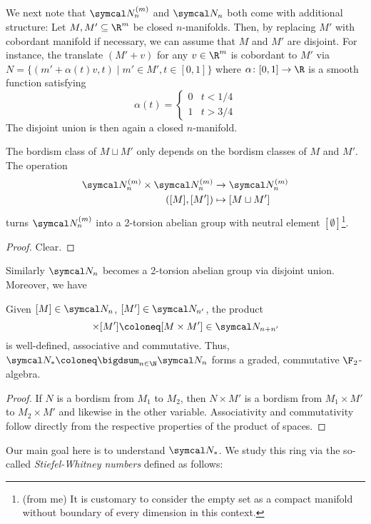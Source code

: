 We next note that $\Bord_n^{(m)}$ and $\Bord_n$ both come with additional structure:
Let $M, M' \subseteq \R^m$ be closed $n$-manifolds.
Then, by replacing $M'$ with cobordant manifold if necessary, we can assume that $M$ and $M'$ are disjoint. For instance, the translate $(M' + v)$ for any $v \in \R^m$ is cobordant to $M'$ via $N = \{(m' + \alpha(t)v, t) \mid m' \in M', t \in [0, 1]\}$ where $\alpha\colon [0, 1] \to \R$ is a smooth function satisfying 
\begin{equation*}
	\alpha(t) = \begin{cases}
		0 & t < 1 / 4 \\
		1 & t > 3 / 4
	\end{cases}
\end{equation*}
The disjoint union is then again a closed $n$-manifold.
\begin{lemma}
	The bordism class of $M \sqcup M'$ only depends on the bordism classes of $M$ and $M'$.
	The operation
	\begin{align*}
		\Bord_n^{(m)} \times \Bord_n^{(m)} &\to \Bord_n^{(m)} \\
		([M], [M']) &\mapsto [M \sqcup M']
	\end{align*}
	turns $\Bord_n^{(m)}$ into a 2-torsion abelian group with neutral element $[\emptyset]$\footnote{(from me) It is customary to consider the empty set as a compact manifold without boundary of every dimension in this context.}.
\end{lemma}
\begin{proof}
	Clear.
\end{proof}
Similarly $\Bord_n$ becomes a 2-torsion abelian group via disjoint union.
Moreover, we have
\begin{lemma}
	Given $[M] \in \Bord_n$, $[M'] \in \Bord_{n'}$, the product
	\begin{equation*}
		[M] \times [M'] \coloneq [M \times M'] \in \Bord_{n + n'}
	\end{equation*}
	is well-defined, associative and commutative.
	Thus, $\Bord_* \coloneq \bigdsum_{n \in \N} \Bord_n$ forms a graded, commutative $\F_2$-algebra.
\end{lemma}
\begin{proof}
	If $N$ is a bordism from $M_1$ to $M_2$, then $N \times M'$ is a bordism from $M_1 \times M'$ to $M_2 \times M'$ and likewise in the other variable.
	Associativity and commutativity follow directly from the respective properties of the product of spaces.
\end{proof}
Our main goal here is to understand $\Bord_*$.
We study this ring via the so-called \emph{Stiefel-Whitney numbers} defined as follows:

